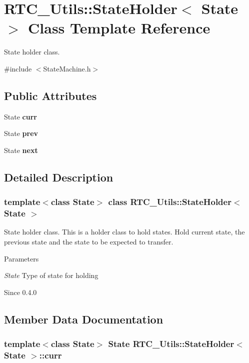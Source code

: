 \section{RTC\_\-Utils::StateHolder$<$ State $>$ Class Template Reference}
\label{structRTC__Utils_1_1StateHolder}


State holder class.  




{\ttfamily \#include $<$StateMachine.h$>$}

\subsection*{Public Attributes}
\begin{DoxyCompactItemize}
\item 
State {\bf curr}
\item 
State {\bf prev}
\item 
State {\bf next}
\end{DoxyCompactItemize}


\subsection{Detailed Description}
\subsubsection*{template$<$class State$>$ class RTC\_\-Utils::StateHolder$<$ State $>$}

State holder class. This is a holder class to hold states. Hold current state, the previous state and the state to be expected to transfer.


\begin{DoxyParams}{Parameters}
\item[{\em State}]Type of state for holding\end{DoxyParams}
\begin{DoxySince}{Since}
0.4.0 
\end{DoxySince}


\subsection{Member Data Documentation}
\subsubsection[{curr}]{\setlength{\rightskip}{0pt plus 5cm}template$<$class State$>$ State {\bf RTC\_\-Utils::StateHolder}$<$ State $>$::{\bf curr}}\label{structRTC__Utils_1_1StateHolder_a6d8c823054382ec53cf68d84b57e8376}



